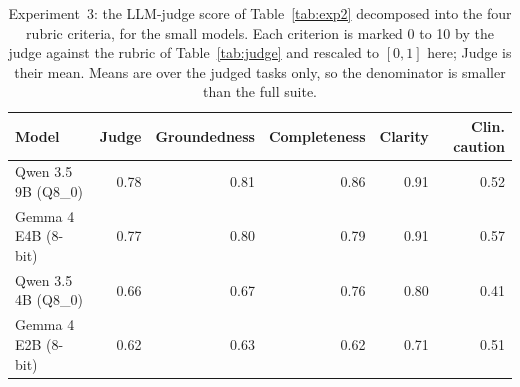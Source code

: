 \begin{table}[H]
\centering
\caption{Experiment~3: the LLM-judge score of Table~\ref{tab:exp2} decomposed into the four rubric criteria, for the small models. Each criterion is marked 0 to 10 by the judge against the rubric of Table~\ref{tab:judge} and rescaled to $[0,1]$ here; Judge is their mean. Means are over the judged tasks only, so the denominator is smaller than the full suite.}
\label{tab:exp2_judge}
\small
\setlength{\tabcolsep}{5pt}
\begin{tabular}{@{}l rrrrr@{}}
\toprule
Model & Judge & Groundedness & Completeness & Clarity & Clin. caution \\
\midrule
Qwen 3.5 9B (Q8\_0) & 0.78 & 0.81 & 0.86 & 0.91 & 0.52 \\
Gemma 4 E4B (8-bit) & 0.77 & 0.80 & 0.79 & 0.91 & 0.57 \\
Qwen 3.5 4B (Q8\_0) & 0.66 & 0.67 & 0.76 & 0.80 & 0.41 \\
Gemma 4 E2B (8-bit) & 0.62 & 0.63 & 0.62 & 0.71 & 0.51 \\
\bottomrule
\end{tabular}
\end{table}
